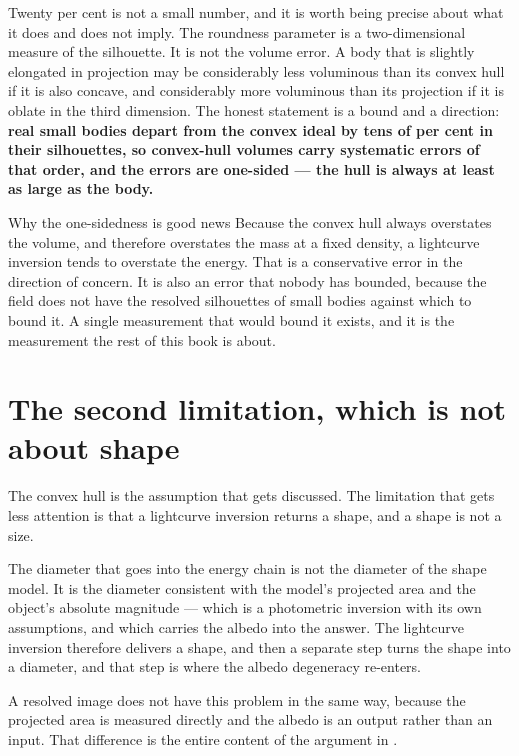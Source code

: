 Twenty per cent is not a small number, and it is worth being precise about
what it does and does not imply. The roundness parameter is a two-dimensional
measure of the silhouette. It is not the volume error. A body that is
slightly elongated in projection may be considerably less voluminous than
its convex hull if it is also concave, and considerably more voluminous than
its projection if it is oblate in the third dimension. The honest statement
is a bound and a direction: \textbf{real small bodies depart from the
convex ideal by tens of per cent in their silhouettes, so convex-hull volumes
carry systematic errors of that order, and the errors are one-sided --- the
hull is always at least as large as the body.}

\begin{seamnote}{Why the one-sidedness is good news}
Because the convex hull always overstates the volume, and therefore
overstates the mass at a fixed density, a lightcurve inversion tends to
overstate the energy. That is a conservative error in the direction of
concern. It is also an error that nobody has bounded, because the field does
not have the resolved silhouettes of small bodies against which to bound it.
A single measurement that would bound it exists, and it is the measurement
the rest of this book is about.
\end{seamnote}

\section{The second limitation, which is not about shape}

The convex hull is the assumption that gets discussed. The limitation that
gets less attention is that a lightcurve inversion returns a shape, and a
shape is not a size.

The diameter that goes into the energy chain is not the diameter of the
shape model. It is the diameter consistent with the model's projected area
and the object's absolute magnitude --- which is a photometric inversion with
its own assumptions, and which carries the albedo into the answer. The
lightcurve inversion therefore delivers a shape, and then a separate step
turns the shape into a diameter, and that step is where the albedo
degeneracy re-enters.

A resolved image does not have this problem in the same way, because the
projected area is measured directly and the albedo is an output rather than
an input. That difference is the entire content of the argument in
.

